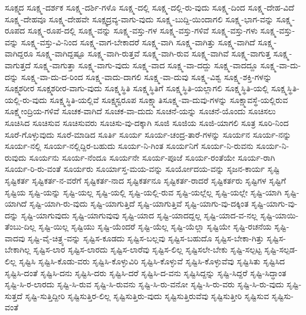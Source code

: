 {ಸೂಕ್ಷ್ಮದ
ಸೂಕ್ಷ್ಮ-ದರ್ಶಕ
ಸೂಕ್ಷ್ಮ-ದರ್ಶಿ-ಗಳೊ
ಸೂಕ್ಷ್ಮ-ದಲ್ಲಿ
ಸೂಕ್ಷ್ಮ-ದಲ್ಲಿ-ರು-ವುದು
ಸೂಕ್ಷ್ಮ-ದಿಂದ
ಸೂಕ್ಷ್ಮ-ದೇಹ-ವಿದೆ
ಸೂಕ್ಷ್ಮ-ದೇಹವೂ
ಸೂಕ್ಷ್ಮ-ದೇಹವೇ
ಸೂಕ್ಷ್ಮದ್ರವ್ಯ-ವಾಗು-ವುದು
ಸೂಕ್ಷ್ಮ-ಬುದ್ದಿ-ಯಿಂದಾಗಲಿ
ಸೂಕ್ಷ್ಮ-ಭಾಗ-ವನ್ನು
ಸೂಕ್ಷ್ಮ-ರೂಪದ
ಸೂಕ್ಷ್ಮ-ರೂಪ-ದಲ್ಲಿ
ಸೂಕ್ಷ್ಮ-ವನ್ನು
ಸೂಕ್ಷ್ಮ-ವಸ್ತು-ಗಳ
ಸೂಕ್ಷ್ಮ-ವಸ್ತು-ಗಳಿವೆ
ಸೂಕ್ಷ್ಮ-ವಸ್ತು-ಗಳು
ಸೂಕ್ಷ್ಮ-ವಸ್ತು-ವನ್ನು
ಸೂಕ್ಷ್ಮ-ವಸ್ತು-ವಿ-ನಿಂದ
ಸೂಕ್ಷ್ಮ-ವಾಗ-ಬೇಕಾದರೆ
ಸೂಕ್ಷ್ಮ-ವಾಗಿ
ಸೂಕ್ಷ್ಮ-ವಾಗಿತ್ತು
ಸೂಕ್ಷ್ಮ-ವಾಗಿದೆ
ಸೂಕ್ಷ್ಮ-ವಾಗಿದ್ದರೂ
ಸೂಕ್ಷ್ಮ-ವಾಗಿದ್ದಷ್ಟೂ
ಸೂಕ್ಷ್ಮ-ವಾಗಿ-ರುತ್ತವೆ
ಸೂಕ್ಷ್ಮ-ವಾಗಿ-ರುವ
ಸೂಕ್ಷ್ಮ-ವಾಗಿವೆ
ಸೂಕ್ಷ್ಮ-ವಾಗುತ್ತ
ಸೂಕ್ಷ್ಮ-ವಾಗುತ್ತದೆ
ಸೂಕ್ಷ್ಮ-ವಾಗುತ್ತಾ
ಸೂಕ್ಷ್ಮ-ವಾಗು-ವುದು
ಸೂಕ್ಷ್ಮ-ವಾದ
ಸೂಕ್ಷ್ಮ-ವಾ-ದದ್ದು
ಸೂಕ್ಷ್ಮ-ವಾದದ್ದೂ
ಸೂಕ್ಷ್ಮ-ವಾ-ದು-ದನ್ನು
ಸೂಕ್ಷ್ಮ-ವಾ-ದು-ದ-ರಿಂದ
ಸೂಕ್ಷ್ಮ-ವಾದು-ದಾಗಲಿ
ಸೂಕ್ಷ್ಮ-ವಾ-ದುವು
ಸೂಕ್ಷ್ಮ-ವಿಶ್ವ
ಸೂಕ್ಷ್ಮ-ಶಕ್ತಿ-ಗಳನ್ನು
ಸೂಕ್ಷ್ಮಶರೀರ
ಸೂಕ್ಷ್ಮಶರೀರ-ವಾಗು-ವುದು
ಸೂಕ್ಷ್ಮಸ್ಥಿತಿ
ಸೂಕ್ಷ್ಮಸ್ಥಿತಿಗೆ
ಸೂಕ್ಷ್ಮಸ್ಥಿತಿ-ಯಲ್ಲಾಗಲಿ
ಸೂಕ್ಷ್ಮಸ್ಥಿತಿ-ಯಲ್ಲಿ
ಸೂಕ್ಷ್ಮಸ್ಥಿತಿ-ಯಲ್ಲಿ-ರು-ವುದು
ಸೂಕ್ಷ್ಮಸ್ಥಿತಿ-ಯಲ್ಲಿವೆ
ಸೂಕ್ಷ್ಮಸ್ವರೂಪ
ಸೂಕ್ಷ್ಮಾತಿಸೂಕ್ಷ್ಮ-ವಾ-ದುವು-ಗಳನ್ನು
ಸೂಕ್ಷ್ಮಾವಸ್ಥೆ-ಯಲ್ಲಿರುವ
ಸೂಕ್ಷ್ಮೇಂದ್ರಿಯ-ಗಳಿವೆ
ಸೂಚಕ-ವಾಗಿದೆ
ಸೂಚಕ-ವಾ-ದುದು
ಸೂಚನೆ-ಯನ್ನು
ಸೂಚನೆ-ಯೊಂದು
ಸೂಚಿಸಲು
ಸೂಚಿಸಿದ
ಸೂಚಿಸುವ
ಸೂಚಿಸುವರು
ಸೂಚಿಸು-ವು-ದಕ್ಕಾಗಿ
ಸೂಜಿ
ಸೂಜಿಯ
ಸೂಜಿ-ಯಾಗಲಿ
ಸೂತ್ರ
ಸೂರಿ-ನಿಂದ
ಸೂರೆ-ಗೊಳ್ಳುವುದು
ಸೂರೆ-ಮಾಡಿದ
ಸೂರ್ತಿ
ಸೂರ್ಯ
ಸೂರ್ಯ-ಚಂದ್ರ-ತಾರೆ-ಗಳನ್ನು
ಸೂರ್ಯನ
ಸೂರ್ಯ-ನನ್ನು
ಸೂರ್ಯ-ನಲ್ಲಿ
ಸೂರ್ಯ-ನಲ್ಲಿದ್ದಿರ-ಬಹುದು
ಸೂರ್ಯ-ನಿ-ಗಿಂತ
ಸೂರ್ಯನಿಗೆ
ಸೂರ್ಯ-ನಿ-ರುವನು
ಸೂರ್ಯ-ನಿ-ರುವುದು
ಸೂರ್ಯನು
ಸೂರ್ಯ-ನೆಂದೂ
ಸೂರ್ಯನೇ
ಸೂರ್ಯ-ಪೂಜೆ
ಸೂರ್ಯ-ರಂತೆಯೇ
ಸೂರ್ಯ-ರಾಗಿ
ಸೂರ್ಯ-ರಿ-ರು-ವಂತೆ
ಸೂರ್ಯರು
ಸೂರ್ಯಾಸ್ತ-ಮಯ-ವನ್ನು
ಸೂರ್ಯೋದಯ-ವನ್ನು
ಸೃಜನ-ಕಾರ್ಯ
ಸೃಷ್ಟಿ
ಸೃಷ್ಟಿಕರ್ತ
ಸೃಷ್ಟಿಕರ್ತ-ನ-ವರೆಗೆ
ಸೃಷ್ಟಿಕರ್ತ-ನಾದ
ಸೃಷ್ಟಿಕರ್ತನೂ
ಸೃಷ್ಟಿಕರ್ತ-ರಾದರೆ
ಸೃಷ್ಟಿಕರ್ತರು
ಸೃಷ್ಟಿಗಳ
ಸೃಷ್ಟಿಗೆ
ಸೃಷ್ಟಿಯ
ಸೃಷ್ಟಿ-ಯನ್ನು
ಸೃಷ್ಟಿ-ಯಲ್ಲ
ಸೃಷ್ಟಿ-ಯಲ್ಲಿ
ಸೃಷ್ಟಿ-ಯಲ್ಲಿ-ರುವ
ಸೃಷ್ಟಿ-ಯಲ್ಲೆಲ್ಲ
ಸೃಷ್ಟಿ-ಯಲ್ಲೇ
ಸೃಷ್ಟಿ-ಯಾಗಿ
ಸೃಷ್ಟಿ-ಯಾಗಿದೆ
ಸೃಷ್ಟಿ-ಯಾಗಿ-ರು-ವುದು
ಸೃಷ್ಟಿ-ಯಾಗುತ್ತಿದೆ
ಸೃಷ್ಟಿ-ಯಾಗುತ್ತಿವೆ
ಸೃಷ್ಟಿ-ಯಾಗು-ವು-ದಕ್ಕಿಂತ
ಸೃಷ್ಟಿ-ಯಾಗು-ವು-ದನ್ನು
ಸೃಷ್ಟಿ-ಯಾಗುವುದು
ಸೃಷ್ಟಿ-ಯಾಗುವುವು
ಸೃಷ್ಟಿ-ಯಾದ
ಸೃಷ್ಟಿ-ಯಾದದ್ದಲ್ಲ
ಸೃಷ್ಟಿ-ಯಾದ-ವ-ನಲ್ಲ
ಸೃಷ್ಟಿ-ಯಾಯಿ-ತೆಂಬು-ದಿಲ್ಲ
ಸೃಷ್ಟಿ-ಯಿಲ್ಲ
ಸೃಷ್ಟಿಯು
ಸೃಷ್ಟಿ-ಯೆಂದರೆ
ಸೃಷ್ಟಿ-ಯೆಲ್ಲ
ಸೃಷ್ಟಿ-ಯೆಲ್ಲಾ
ಸೃಷ್ಟಿಯೇ
ಸೃಷ್ಟಿ-ರಚನೆಯ
ಸೃಷ್ಟಿ-ವಾದವು
ಸೃಷ್ಟಿ-ವೈ-ಚಿತ್ರ್ಯ-ವನ್ನು
ಸೃಷ್ಟಿಸ-ಕೂಡದು
ಸೃಷ್ಟಿಸ-ಬಲ್ಲವು
ಸೃಷ್ಟಿಸ-ಬಹುದೊ
ಸೃಷ್ಟಿಸ-ಬೇಕಾ-ಗಿತ್ತು
ಸೃಷ್ಟಿಸ-ಬೇಕಾಗಿಲ್ಲ
ಸೃಷ್ಟಿಸ-ಲಾರ
ಸೃಷ್ಟಿಸ-ಲಾರದು
ಸೃಷ್ಟಿಸ-ಲಾರೆವು
ಸೃಷ್ಟಿಸ-ಲಿಲ್ಲ
ಸೃಷ್ಟಿಸಲೇ-ಬೇಕು
ಸೃಷ್ಟಿ-ಸಲ್ಪಟ್ಟ
ಸೃಷ್ಟಿ-ಸಲ್ಪಡ-ಲಿಲ್ಲ
ಸೃಷ್ಟಿಸಿ
ಸೃಷ್ಟಿಸಿ-ಕೊಡು-ವರು
ಸೃಷ್ಟಿಸಿ-ಕೊಳ್ಳುವಿರಿ
ಸೃಷ್ಟಿಸಿ-ಕೊಳ್ಳುವೆ
ಸೃಷ್ಟಿಸಿ-ಕೊಳ್ಳುವೆವು
ಸೃಷ್ಟಿಸಿತು
ಸೃಷ್ಟಿಸಿದ
ಸೃಷ್ಟಿಸಿ-ದಂತೆ
ಸೃಷ್ಟಿಸಿ-ದನು
ಸೃಷ್ಟಿಸಿ-ದರು
ಸೃಷ್ಟಿಸಿ-ದರೆ
ಸೃಷ್ಟಿಸಿ-ದ-ವನು
ಸೃಷ್ಟಿಸಿದ್ದನ್ನು
ಸೃಷ್ಟಿ-ಸಿದ್ದರೆ
ಸೃಷ್ಟಿ-ಸಿದ್ಧಾಂತ
ಸೃಷ್ಟಿ-ಸಿ-ರ-ಲಾರದು
ಸೃಷ್ಟಿ-ಸಿ-ರುವ
ಸೃಷ್ಟಿ-ಸಿ-ರುವನು
ಸೃಷ್ಟಿ-ಸಿ-ರು-ವನೋ
ಸೃಷ್ಟಿ-ಸಿ-ರು-ವರು
ಸೃಷ್ಟಿ-ಸಿ-ರು-ವುದು
ಸೃಷ್ಟಿ-ಸುತ್ತದೆ
ಸೃಷ್ಟಿ-ಸುತ್ತಿದ್ದೀರಿ
ಸೃಷ್ಟಿಸುತ್ತಿರ-ಲಿಲ್ಲ
ಸೃಷ್ಟಿಸುತ್ತಿರು-ವುದು
ಸೃಷ್ಟಿಸುತ್ತಿರುವೆವು
ಸೃಷ್ಟಿಸುತ್ತೀರಿ
ಸೃಷ್ಟಿಸುವ
ಸೃಷ್ಟಿಸು-ವಂತೆ
}
